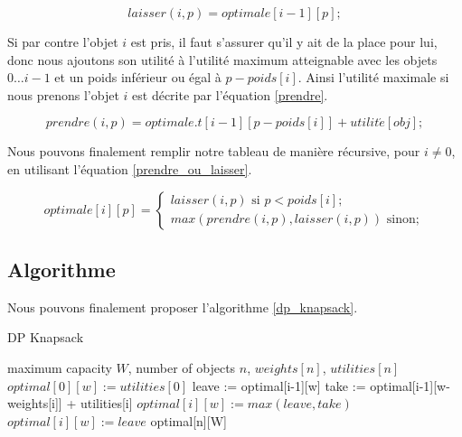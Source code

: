 \begin{equation}
\label{laisser}
laisser(i, p) = optimale[i-1][p];
\end{equation}


Si par contre l'objet $i$ est pris, il faut s'assurer qu'il y ait de
la place pour lui, donc nous ajoutons son utilité à l'utilité maximum
atteignable avec les objets $0 \dots i-1$ et un poids inférieur ou
égal à $p-poids[i]$. Ainsi l'utilité maximale si nous prenons l'objet
$i$ est décrite par l'équation \ref{prendre}.

\begin{equation}
\label{prendre}
prendre(i, p) = optimale.t[i-1][p - poids[i]] + utilit\acute{e}[obj];
\end{equation}

Nous pouvons finalement remplir notre tableau de manière récursive, pour $i \neq 0$, en utilisant l'équation \ref{prendre_ou_laisser}.

\begin{equation}
\label{prendre_ou_laisser}
optimale[i][p] =
	\begin{cases}
		laisser(i, p) \text{ si } p < poids[i];	\\
		max(prendre(i, p), laisser(i, p)) \text{ sinon};
	\end{cases}
\end{equation}


\subsection{Algorithme}

Nous pouvons finalement proposer l'algorithme \ref{dp_knapsack}.

\begin{algorithm}[!ht]
\caption{DP Knapsack}
\label{dp_knapsack}
\begin{algorithmic}[1]
\REQUIRE maximum capacity $W$, number of objects $n$, $weights[n]$, $utilities[n]$  
		\STATE $optimal[0][w] := utilities[0]$
	\ENDIF
\ENDFOR
{}
		\STATE leave := optimal[i-1][w]
		\STATE take := optimal[i-1][w-weights[i]] + utilities[i]
			\STATE $optimal[i][w] := max(leave, take)$
		\ELSE
			\STATE $optimal[i][w] := leave$
		\ENDIF
	\ENDFOR
\ENDFOR
\RETURN optimal[n][W]
\end{algorithmic}
\end{algorithm}


